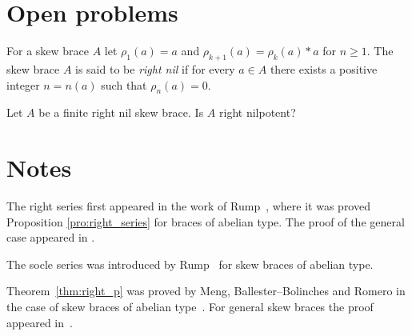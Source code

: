 \section*{Open problems}
\begin{problem}
    \label{question:rightnil=>rightnilp} 
For a skew brace $A$ let $\rho_1(a)=a$ and $\rho_{k+1}(a)=\rho_k(a)*a$ for
$n\geq1$.  The skew brace $A$ is said to be \emph{right nil} if for every $a\in A$ there
exists a positive integer $n=n(a)$ such that $\rho_n(a)=0$. 

Let $A$ be a finite right nil skew brace.  Is $A$ right
    nilpotent? 
\end{problem}

\section*{Notes}

The right series first appeared in the work of Rump~\cite{MR2278047}, 
where it was proved Proposition \ref{pro:right_series} for braces of abelian type. The proof of the general case appeared in \cite{MR3957824}.  

The socle series was introduced by Rump~\cite{MR2278047} for skew braces of abelian type. 


Theorem~\ref{thm:right_p} was proved by Meng, Ballester--Bolinches and Romero in the case of skew  braces of abelian type~\cite{MR3935814}. For general skew
braces the proof appeared in~\cite{MR4062375}. 
